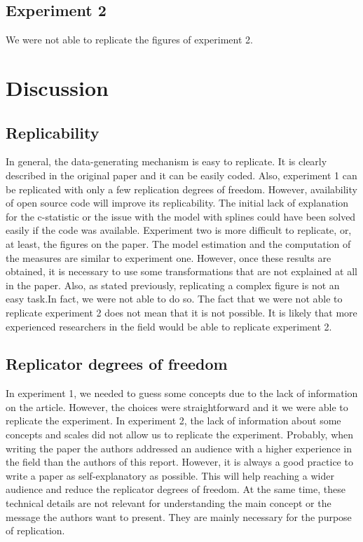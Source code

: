 \documentclass[10,a4paperpaper,]{article}
\begin{document}
\subsection{Experiment 2}

We were not able to replicate the figures of experiment 2.

\FloatBarrier

\section{Discussion}

\subsection{Replicability}

In general, the data-generating mechanism is easy to replicate. It is
clearly described in the original paper and it can be easily coded.
Also, experiment 1 can be replicated with only a few replication degrees
of freedom. However, availability of open source code will improve its
replicability. The initial lack of explanation for the c-statistic or
the issue with the model with splines could have been solved easily if
the code was available. Experiment two is more difficult to replicate,
or, at least, the figures on the paper. The model estimation and the
computation of the measures are similar to experiment one. However, once
these results are obtained, it is necessary to use some transformations
that are not explained at all in the paper. Also, as stated previously,
replicating a complex figure is not an easy task.In fact, we were not
able to do so. The fact that we were not able to replicate experiment 2
does not mean that it is not possible. It is likely that more
experienced researchers in the field would be able to replicate
experiment 2.

\subsection{Replicator degrees of freedom}

In experiment 1, we needed to guess some concepts due to the lack of
information on the article. However, the choices were straightforward
and it we were able to replicate the experiment. In experiment 2, the
lack of information about some concepts and scales did not allow us to
replicate the experiment. Probably, when writing the paper the authors
addressed an audience with a higher experience in the field than the
authors of this report. However, it is always a good practice to write a
paper as self-explanatory as possible. This will help reaching a wider
audience and reduce the replicator degrees of freedom. At the same time,
these technical details are not relevant for understanding the main
concept or the message the authors want to present. They are mainly
necessary for the purpose of replication.
\end{document}
